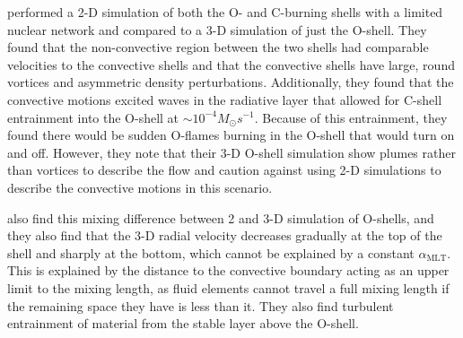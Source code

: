 \cite{meakinActiveCarbonOxygen2006} performed a 2-D simulation of both the O- and C-burning shells with a limited nuclear network and compared to a 3-D simulation of just the O-shell.
They found that the non-convective region between the two shells had comparable velocities to the convective shells and that the convective shells have large, round vortices and asymmetric density perturbations.
Additionally, they found that the convective motions excited waves in the radiative layer that allowed for C-shell entrainment into the O-shell at $\sim10^{-4} M_\odot s^{-1}$.
Because of this entrainment, they found there would be sudden O-flames burning in the O-shell that would turn on and off.
However, they note that their 3-D O-shell simulation show plumes rather than vortices to describe the flow and caution against using 2-D simulations to describe the convective motions in this scenario. 

\cite{meakinTurbulentConvectionStellar2007} also find this mixing difference between 2 and 3-D simulation of O-shells, and they also find that the 3-D radial velocity decreases gradually at the top of the shell and sharply at the bottom, which cannot be explained by a constant $\alpha_{\mathrm{MLT}}$.
This is explained by the distance to the convective boundary acting as an upper limit to the mixing length, as fluid elements cannot travel a full mixing length if the remaining space they have is less than it.
They also find turbulent entrainment of material from the stable layer above the O-shell. 

